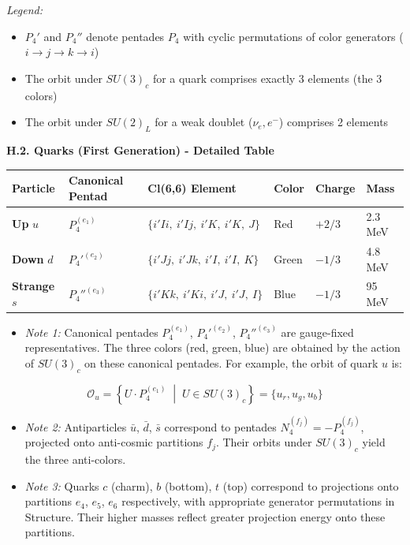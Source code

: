 \documentclass[11pt]{article}
\providecommand{\tightlist}{\setlength{\itemsep}{2pt}\setlength{\parskip}{6pt}}
\let\oldmathcal\mathcal
\renewcommand{\mathcal}[1]{\oldmathcal{#1}}
\providecommand{\tightlist}{%
  \setlength{\itemsep}{2pt}\setlength{\parskip}{6pt}
}
\begin{document}
\emph{Legend:}

\begin{itemize}
\tightlist
\item
  \(P_4'\) and \(P_4''\) denote pentades \(P_4\) with cyclic
  permutations of color generators (\(i \to j \to k \to i\))
\item
  The orbit under \(SU(3)_c\) for a quark comprises exactly 3 elements
  (the 3 colors)
\item
  The orbit under \(SU(2)_L\) for a weak doublet (\(\nu_e, e^-\))
  comprises 2 elements
\end{itemize}

\textbf{H.2. Quarks (First Generation) - Detailed Table}

\begin{table}[H]
\centering
\begin{tabular}{@{}llllll@{}}
\toprule
\textbf{Particle} & \textbf{Canonical Pentad} & \textbf{Cl(6,6) Element} & \textbf{Color} & \textbf{Charge} & \textbf{Mass} \\
\midrule
\textbf{Up} $u$ & $P_4^{(e_1)}$ & $\{i'Ii,\ i'Ij,\ i'K,\ i'K,\ J\}$ & Red & $+2/3$ & 2.3 MeV \\
\textbf{Down} $d$ & $P_4'^{(e_2)}$ & $\{i'Jj,\ i'Jk,\ i'I,\ i'I,\ K\}$ & Green & $-1/3$ & 4.8 MeV \\
\textbf{Strange} $s$ & $P_4''^{(e_3)}$ & $\{i'Kk,\ i'Ki,\ i'J,\ i'J,\ I\}$ & Blue & $-1/3$ & 95 MeV \\
\bottomrule
\end{tabular}
\end{table}

\begin{itemize}
\tightlist
\item
  \emph{Note 1:} Canonical pentades \(P_4^{(e_1)}\), \(P_4'^{(e_2)}\),
  \(P_4''^{(e_3)}\) are gauge-fixed representatives. The three colors
  (red, green, blue) are obtained by the action of \(SU(3)_c\) on these
  canonical pentades. For example, the orbit of quark \(u\) is:
\end{itemize}

\[\mathcal{O}_u = \left\{ U \cdot P_4^{(e_1)} \;\middle|\; U \in SU(3)_c \right\} = \{u_r, u_g, u_b\}\]

\begin{itemize}
\tightlist
\item
  \emph{Note 2:} Antiparticles \(\bar{u}\), \(\bar{d}\), \(\bar{s}\)
  correspond to pentades \(N_4^{(f_j)} = -P_4^{(f_j)}\), projected onto
  anti-cosmic partitions \(f_j\). Their orbits under \(SU(3)_c\) yield
  the three anti-colors.
\item
  \emph{Note 3:} Quarks \(c\) (charm), \(b\) (bottom), \(t\) (top)
  correspond to projections onto partitions \(e_4\), \(e_5\), \(e_6\)
  respectively, with appropriate generator permutations in Structure.
  Their higher masses reflect greater projection energy onto these
  partitions.
\end{itemize}
\end{document}
